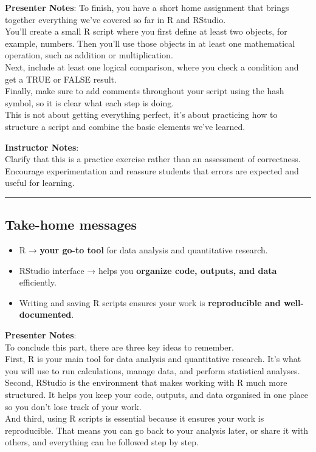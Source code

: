 \documentclass[
  letterpaper,
  DIV=11,
  numbers=noendperiod]{scrartcl}
\providecommand{\tightlist}{%
  \setlength{\itemsep}{0pt}\setlength{\parskip}{0pt}}
\begin{document}
\textbf{Presenter Notes}: To finish, you have a short home assignment
that brings together everything we've covered so far in R and RStudio.\\
You'll create a small R script where you first define at least two
objects, for example, numbers. Then you'll use those objects in at least
one mathematical operation, such as addition or multiplication.\\
Next, include at least one logical comparison, where you check a
condition and get a TRUE or FALSE result.\\
Finally, make sure to add comments throughout your script using the hash
symbol, so it is clear what each step is doing.\\
This is not about getting everything perfect, it's about practicing how
to structure a script and combine the basic elements we've learned.

\textbf{Instructor Notes}:\\
Clarify that this is a practice exercise rather than an assessment of
correctness. Encourage experimentation and reassure students that errors
are expected and useful for learning.

\begin{center}\rule{0.5\linewidth}{0.5pt}\end{center}

\subsection{Take-home messages}\label{take-home-messages}

\begin{itemize}
\tightlist
\item
  R → \textbf{your go-to tool} for data analysis and quantitative
  research.
\item
  RStudio interface → helps you \textbf{organize code, outputs, and
  data} efficiently.
\item
  Writing and saving R scripts ensures your work is \textbf{reproducible
  and well-documented}.
\end{itemize}

\textbf{Presenter Notes}:\\
To conclude this part, there are three key ideas to remember.\\
First, R is your main tool for data analysis and quantitative research.
It's what you will use to run calculations, manage data, and perform
statistical analyses.\\
Second, RStudio is the environment that makes working with R much more
structured. It helps you keep your code, outputs, and data organised in
one place so you don't lose track of your work.\\
And third, using R scripts is essential because it ensures your work is
reproducible. That means you can go back to your analysis later, or
share it with others, and everything can be followed step by step.
\end{document}
